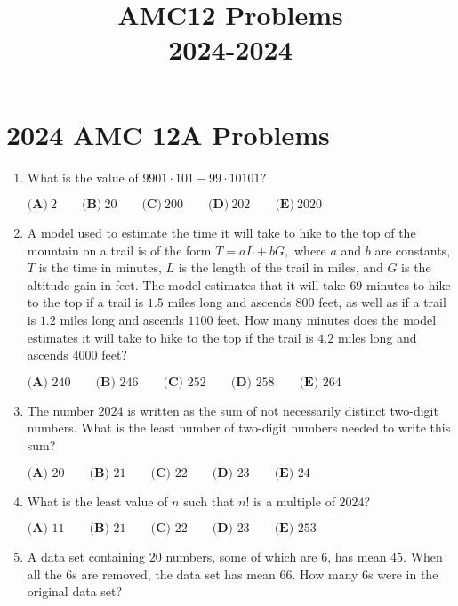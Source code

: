 \documentclass{article}
\title{AMC12 Problems \\ 2024-2024}
\date{}
\begin{document}
\maketitle\thispagestyle{fancy}\tableofcontents\newpage\section*{2024 AMC 12A Problems}
\begin{enumerate}[label=\arabic*., itemsep=0.5em]\item What is the value of \(9901\cdot101-99\cdot10101?\)

\(\textbf{(A)}~2\qquad\textbf{(B)}~20\qquad\textbf{(C)}~200\qquad\textbf{(D)}~202\qquad\textbf{(E)}~2020\)\par \vspace{0.5em}\item A model used to estimate the time it will take to hike to the top of the mountain on a trail is of the form \(T=aL+bG,\) where \(a\) and \(b\) are constants, \(T\) is the time in minutes, \(L\) is the length of the trail in miles, and \(G\) is the altitude gain in feet. The model estimates that it will take \(69\) minutes to hike to the top if a trail is \(1.5\) miles long and ascends \(800\) feet, as well as if a trail is \(1.2\) miles long and ascends \(1100\) feet. How many minutes does the model estimates it will take to hike to the top if the trail is \(4.2\) miles long and ascends \(4000\) feet?

\(\textbf{(A) }240\qquad\textbf{(B) }246\qquad\textbf{(C) }252\qquad\textbf{(D) }258\qquad\textbf{(E) }264\)\par \vspace{0.5em}\item The number \(2024\) is written as the sum of not necessarily distinct two-digit numbers. What is the least number of two-digit numbers needed to write this sum?

\(\textbf{(A) }20\qquad\textbf{(B) }21\qquad\textbf{(C) }22\qquad\textbf{(D) }23\qquad\textbf{(E) }24\)\par \vspace{0.5em}\item What is the least value of \(n\) such that \(n!\) is a multiple of \(2024\)?

\(
\textbf{(A) }11 \qquad
\textbf{(B) }21 \qquad
\textbf{(C) }22 \qquad
\textbf{(D) }23 \qquad
\textbf{(E) }253 \qquad
\)\par \vspace{0.5em}\item A data set containing \(20\) numbers, some of which are \(6\), has mean \(45\). When all the 6s are removed, the data set has mean \(66\). How many 6s were in the original data set?


\end{enumerate}
\end{document}
